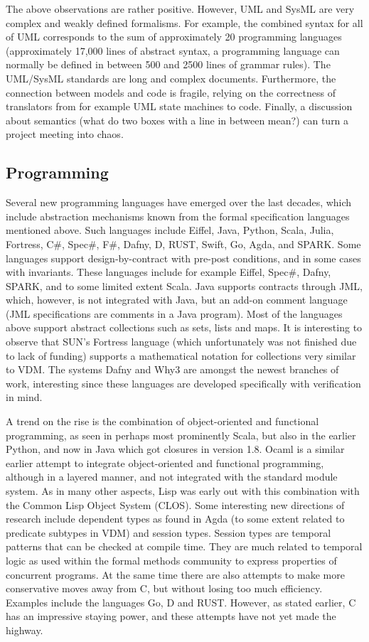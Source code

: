 The above observations are rather positive. However, UML and
SysML are very complex and weakly defined formalisms. 
For example, the combined syntax for all of UML corresponds 
to the sum of approximately 20 programming languages (approximately 
17,000 lines of abstract syntax, a programming language can 
normally be defined in between 500 and 2500 lines of grammar 
rules). The UML/SysML standards are long and complex documents. 
Furthermore, the connection between models and code is fragile, relying on the correctness of translators from for example UML state machines to code. Finally, a discussion about semantics
(what do two boxes with a line in between mean?) can turn 
a project meeting into chaos.


\subsection{Programming}

Several new programming languages have emerged over the last 
decades, which include abstraction mechanisms known from the formal 
specification languages mentioned above. Such languages include 
Eiffel, Java, Python, Scala, Julia, Fortress,  C\#, Spec\#, F\#,  Dafny, D, 
RUST, Swift, Go, Agda, and SPARK.  Some languages support 
design-by-contract with pre-post conditions, and in some cases with 
invariants. These languages  include for example Eiffel, Spec\#, 
Dafny, SPARK, and to some limited extent Scala. Java supports 
contracts through JML, which, however, is not integrated with Java, 
but an add-on comment language (JML specifications are comments in 
a Java program). Most of the languages above support abstract 
collections such as sets, lists and maps. It is interesting to 
observe that SUN’s Fortress language (which unfortunately was not 
finished due to lack of funding) supports a mathematical 
notation for collections very similar to VDM. The systems 
Dafny and Why3 are amongst the newest branches of work, 
interesting since these languages are developed 
specifically with verification in mind.

A trend on the rise is the combination of object-oriented 
and functional programming, as seen in perhaps most prominently 
Scala, but also in the earlier Python, and now in Java which got 
closures in version 1.8.  Ocaml is a similar earlier attempt to 
integrate object-oriented and functional programming, although in a 
layered manner, and not integrated with the standard module system. 
As in many other aspects, Lisp was early out
with this combination with the Common Lisp Object System (CLOS).
Some interesting new directions of research include dependent types 
as found in Agda (to some extent related to predicate subtypes in 
VDM) and session types. Session types are temporal patterns that 
can be checked at compile time. They are much related to temporal 
logic as used within the formal methods community to express 
properties of concurrent programs. At the same time there are also 
attempts to make more conservative moves away from C, but without 
losing too much efficiency. Examples include the languages Go, D and RUST. However, as stated earlier, C has an impressive staying power, and these attempts have not yet made the highway.

